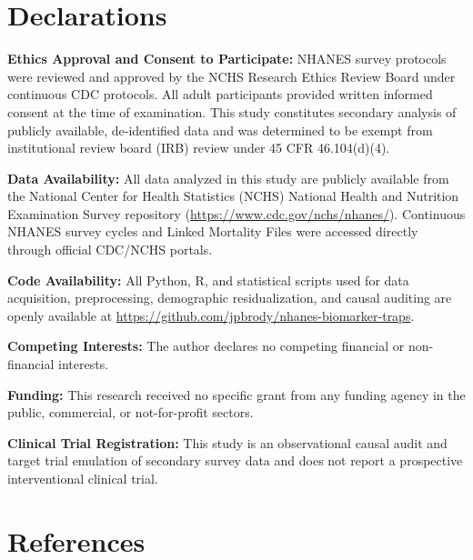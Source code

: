 \documentclass[10pt,letterpaper]{article}
\begin{document}
\section*{Declarations}
\small
\noindent\textbf{Ethics Approval and Consent to Participate:} NHANES survey protocols were reviewed and approved by the NCHS Research Ethics Review Board under continuous CDC protocols. All adult participants provided written informed consent at the time of examination. This study constitutes secondary analysis of publicly available, de-identified data and was determined to be exempt from institutional review board (IRB) review under 45 CFR 46.104(d)(4).\par\vspace{3pt}
\noindent\textbf{Data Availability:} All data analyzed in this study are publicly available from the National Center for Health Statistics (NCHS) National Health and Nutrition Examination Survey repository (\url{https://www.cdc.gov/nchs/nhanes/}). Continuous NHANES survey cycles and Linked Mortality Files were accessed directly through official CDC/NCHS portals.\par\vspace{3pt}
\noindent\textbf{Code Availability:} All Python, R, and statistical scripts used for data acquisition, preprocessing, demographic residualization, and causal auditing are openly available at \url{https://github.com/jpbrody/nhanes-biomarker-traps}.\par\vspace{3pt}
\noindent\textbf{Competing Interests:} The author declares no competing financial or non-financial interests.\par\vspace{3pt}
\noindent\textbf{Funding:} This research received no specific grant from any funding agency in the public, commercial, or not-for-profit sectors.\par\vspace{3pt}
\noindent\textbf{Clinical Trial Registration:} This study is an observational causal audit and target trial emulation of secondary survey data and does not report a prospective interventional clinical trial.

\section*{References}
\end{document}
